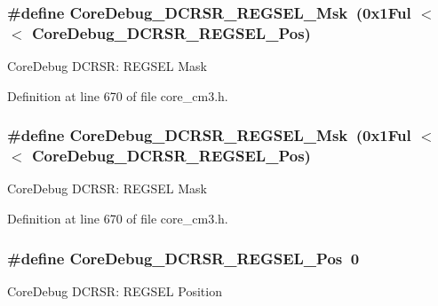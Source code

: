 \subsubsection[{\texorpdfstring{Core\+Debug\+\_\+\+D\+C\+R\+S\+R\+\_\+\+R\+E\+G\+S\+E\+L\+\_\+\+Msk}{CoreDebug_DCRSR_REGSEL_Msk}}]{\setlength{\rightskip}{0pt plus 5cm}\#define Core\+Debug\+\_\+\+D\+C\+R\+S\+R\+\_\+\+R\+E\+G\+S\+E\+L\+\_\+\+Msk~(0x1\+Ful $<$$<$ Core\+Debug\+\_\+\+D\+C\+R\+S\+R\+\_\+\+R\+E\+G\+S\+E\+L\+\_\+\+Pos)}\hypertarget{group___c_m_s_i_s___c_m3___core_debug_ga17cafbd72b55030219ce5609baa7c01d}{}\label{group___c_m_s_i_s___c_m3___core_debug_ga17cafbd72b55030219ce5609baa7c01d}
Core\+Debug D\+C\+R\+SR\+: R\+E\+G\+S\+EL Mask 

Definition at line 670 of file core\+\_\+cm3.\+h.

\subsubsection[{\texorpdfstring{Core\+Debug\+\_\+\+D\+C\+R\+S\+R\+\_\+\+R\+E\+G\+S\+E\+L\+\_\+\+Msk}{CoreDebug_DCRSR_REGSEL_Msk}}]{\setlength{\rightskip}{0pt plus 5cm}\#define Core\+Debug\+\_\+\+D\+C\+R\+S\+R\+\_\+\+R\+E\+G\+S\+E\+L\+\_\+\+Msk~(0x1\+Ful $<$$<$ Core\+Debug\+\_\+\+D\+C\+R\+S\+R\+\_\+\+R\+E\+G\+S\+E\+L\+\_\+\+Pos)}\hypertarget{group___c_m_s_i_s___c_m3___core_debug_ga17cafbd72b55030219ce5609baa7c01d}{}\label{group___c_m_s_i_s___c_m3___core_debug_ga17cafbd72b55030219ce5609baa7c01d}
Core\+Debug D\+C\+R\+SR\+: R\+E\+G\+S\+EL Mask 

Definition at line 670 of file core\+\_\+cm3.\+h.

\subsubsection[{\texorpdfstring{Core\+Debug\+\_\+\+D\+C\+R\+S\+R\+\_\+\+R\+E\+G\+S\+E\+L\+\_\+\+Pos}{CoreDebug_DCRSR_REGSEL_Pos}}]{\setlength{\rightskip}{0pt plus 5cm}\#define Core\+Debug\+\_\+\+D\+C\+R\+S\+R\+\_\+\+R\+E\+G\+S\+E\+L\+\_\+\+Pos~0}\hypertarget{group___c_m_s_i_s___c_m3___core_debug_ga52182c8a9f63a52470244c0bc2064f7b}{}\label{group___c_m_s_i_s___c_m3___core_debug_ga52182c8a9f63a52470244c0bc2064f7b}
Core\+Debug D\+C\+R\+SR\+: R\+E\+G\+S\+EL Position 


